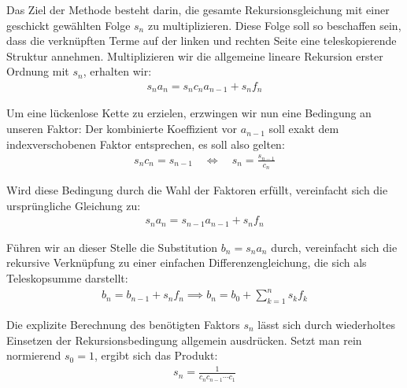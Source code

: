 \documentclass{article}
\theoremstyle{definition}
\begin{document}
Das Ziel der Methode besteht darin, die gesamte Rekursionsgleichung mit einer geschickt gewählten Folge $s_n$ zu multiplizieren. Diese Folge soll so beschaffen sein, dass die verknüpften Terme auf der linken und rechten Seite eine teleskopierende Struktur annehmen. Multiplizieren wir die allgemeine lineare Rekursion erster Ordnung mit $s_n$, erhalten wir:
\begin{align*}
    s_n a_n = s_n c_n a_{n-1} + s_n f_n
\end{align*}

Um eine lückenlose Kette zu erzielen, erzwingen wir nun eine Bedingung an unseren Faktor: Der kombinierte Koeffizient vor $a_{n-1}$ soll exakt dem indexverschobenen Faktor entsprechen, es soll also gelten:
\begin{align*}
    s_n c_n = s_{n-1} \quad \Longleftrightarrow \quad s_n = \frac{s_{n-1}}{c_n}
\end{align*}

Wird diese Bedingung durch die Wahl der Faktoren erfüllt, vereinfacht sich die ursprüngliche Gleichung zu:
\begin{align*}
    s_n a_n = s_{n-1} a_{n-1} + s_n f_n
\end{align*}

Führen wir an dieser Stelle die Substitution $b_n = s_n a_n$ durch, vereinfacht sich die rekursive Verknüpfung zu einer einfachen Differenzengleichung, die sich als Teleskopsumme darstellt:
\begin{align*}
    b_n = b_{n-1} + s_n f_n \implies b_n = b_0 + \sum_{k=1}^n s_k f_k
\end{align*}

Die explizite Berechnung des benötigten Faktors $s_n$ lässt sich durch wiederholtes Einsetzen der Rekursionsbedingung allgemein ausdrücken. Setzt man rein normierend $s_0 = 1$, ergibt sich das Produkt:
\begin{align*}
    s_n = \frac{1}{c_n c_{n-1} \cdots c_1}
\end{align*}
\end{document}
